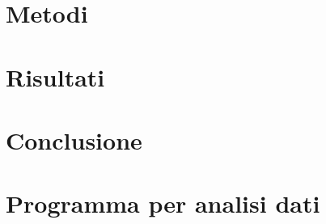 \documentclass[
    rmp,
    reprint, 
    superscriptaddress, 
    altaffilletter, 
    amsmath, 
    amssymb, 
    a4paper]{revtex4-2}
\begin{document}

\section{Metodi}
\label{section:methods}


\section{Risultati}
\label{section:results}

\section{Conclusione}
\label{section:conclusion}

\onecolumngrid
\appendix

\setcounter{table}{0}
\renewcommand{\thetable}{A-\Roman{table}}

\section{Programma per analisi dati}

\end{document}
